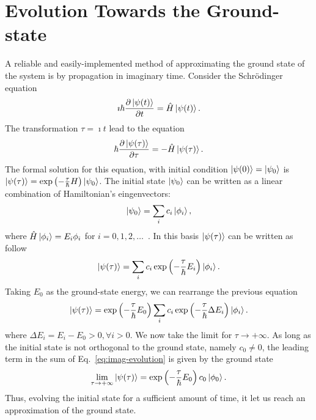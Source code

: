 \section{Evolution Towards the Ground-state}
A reliable and easily-implemented method of approximating the ground state of the
system is by propagation in imaginary time. Consider the Schr\"odinger equation
\begin{equation}
\imath \hbar \frac{\partial \ket{\psi(t)}}{\partial t} = \hat{H} \ket{\psi(t)}.
\end{equation}
The transformation $ \tau = \imath t$ lead to the equation
\begin{equation}
\hbar \frac{\partial \ket{\psi(\tau)}}{\partial \tau} = - \hat{H} \ket{\psi(\tau)}.
\end{equation}
The formal solution for this equation, with initial condition $\ket{\psi(0)} = \ket{\psi_0}$ is $\ket{\psi(\tau)} = \exp\left( -\frac{\tau}{\hbar} H \right) \ket{\psi_0}$. The initial state $\ket{\psi_0}$ can be written as a linear combination of Hamiltonian's eingenvectors:
\begin{equation}
\ket{\psi_0} = \sum_i c_i \ket{\phi_i},
\end{equation}
where $\hat{H} \ket{\phi_i} = E_i \phi_i$ for $i = 0,1,2,\ldots$~. In this basis $\ket{\psi(\tau)}$ can be written as follow
\begin{equation}
\ket{\psi(\tau)} = \sum_i c_i \exp\left( -\frac{\tau}{\hbar} E_i \right) \ket{\phi_i}.
\end{equation}
Taking $E_0$ as the ground-state energy, we can rearrange the previous equation
\begin{equation} \label{eq:imag-evolution}
\ket{\psi(\tau)} = \exp \left( -\frac{\tau}{\hbar} E_0 \right) \sum_i c_i  \exp\left( -\frac{\tau}{\hbar} \Delta E_i \right) \ket{\phi_i}.
\end{equation}
where $\Delta E_i = E_i - E_0 > 0,  \forall i > 0$. We now take the limit for $\tau \rightarrow +\infty$. As long as the initial state is not orthogonal to the ground state, namely $c_0 \neq 0$, the leading term in the sum of Eq.~\eqref{eq:imag-evolution} is given by the ground state
\begin{equation}
\lim_{\tau \rightarrow +\infty} \ket{\psi(\tau)} = \exp \left( -\frac{\tau}{\hbar} E_0 \right) c_0 \ket{\phi_0}.
\end{equation}
Thus, evolving the initial state for a sufficient amount of time, it let us reach an  approximation of the ground state.

